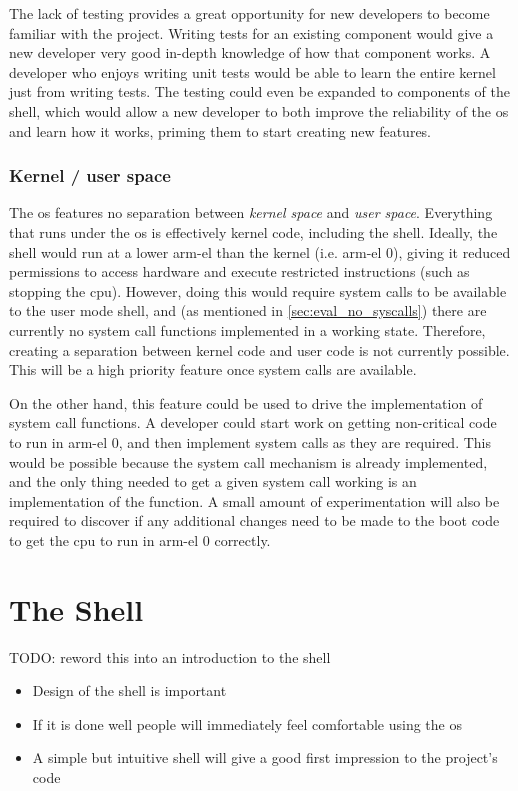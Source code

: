 \documentclass{article}
\begin{document}
The lack of testing provides a great opportunity for new developers to become
familiar with the project. Writing tests for an existing component would give a
new developer very good in-depth knowledge of how that component works. A
developer who enjoys writing unit tests would be able to learn the entire
kernel just from writing tests. The testing could even be expanded to
components of the shell, which would allow a new developer to both improve the
reliability of the \gls{os} and learn how it works, priming them to start
creating new features.

\subsubsection{Kernel / user space}
The \gls{os} features no separation between \emph{kernel space} and \emph{user
space}. Everything that runs under the \gls{os} is effectively kernel code,
including the shell. Ideally, the shell would run at a lower \gls{arm-el} than
the kernel (i.e. \gls{arm-el} 0), giving it reduced permissions to access
hardware and execute restricted instructions (such as stopping the \gls{cpu}).
However, doing this would require system calls to be available to the user mode
shell, and (as mentioned in \autoref{sec:eval_no_syscalls}) there are currently
no system call functions implemented in a working state. Therefore, creating a
separation between kernel code and user code is not currently possible. This
will be a high priority feature once system calls are available.

On the other hand, this feature could be used to drive the implementation of
system call functions. A developer could start work on getting non-critical
code to run in \gls{arm-el} 0, and then implement system calls as they are
required. This would be possible because the system call mechanism is already
implemented, and the only thing needed to get a given system call working is an
implementation of the function. A small amount of experimentation will also be
required to discover if any additional changes need to be made to the boot code
to get the \gls{cpu} to run in \gls{arm-el} 0 correctly.

\section{The Shell}
TODO: reword this into an introduction to the shell

\begin{itemize}
    \item Design of the shell is important
    \item If it is done well people will immediately feel comfortable using the
        \gls{os}
    \item A simple but intuitive shell will give a good first impression to the
        project's code
\end{itemize}
\end{document}
